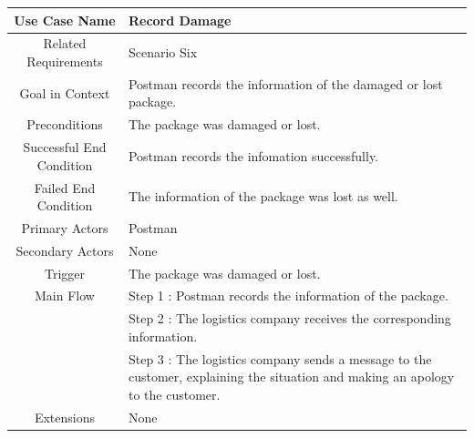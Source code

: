 \documentclass[12pt]{scrreprt}
\begin{document}
\begin{table}
  \centering
  \begin{tabular}{| c | p{11cm} |}
    \hline
    Use Case Name & Record Damage\\
    \hline
    Related Requirements & Scenario Six\\
    \hline
    Goal in Context & Postman records the information of the damaged or
    lost package.\\
    \hline
    Preconditions & The package was damaged or lost.\\
    \hline
    Successful End Condition & Postman records the infomation successfully.\\
    \hline
    Failed End Condition & The information of the package was lost as well.\\
    \hline
    Primary Actors & Postman\\
    \hline
    Secondary Actors & None\\
    \hline
    Trigger & The package was damaged or lost.\\
    \hline
    Main Flow & Step 1 : Postman records the information of the package.\\
    & Step 2 : The logistics company receives the corresponding information.\\
    & Step 3 : The logistics company sends a message to the customer,
    explaining the situation and making an apology to the customer.\\
    \hline
    Extensions & None\\
    \hline
  \end{tabular}
\end{table}
\end{document}
